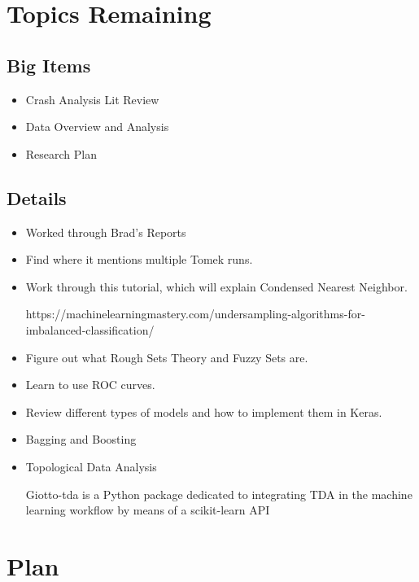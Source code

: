 
\section{Topics Remaining}

\subsection{Big Items}

\begin{itemize}
	\item Crash Analysis Lit Review
	\item Data Overview and Analysis
	\item Research Plan
\end{itemize}

\subsection{Details}
\begin{itemize}
	\item Worked through Brad's Reports
	\item Find where it mentions multiple Tomek runs.  
	\item Work through this tutorial, which will explain Condensed Nearest Neighbor.
	
	https://machinelearningmastery.com/undersampling-algorithms-for-imbalanced-classification/
	
	\item Figure out what Rough Sets Theory and Fuzzy Sets are.  
	\item Learn to use ROC curves.
	\item Review different types of models and how to implement them in Keras.
	\item Bagging and Boosting
	\item Topological Data Analysis
	
	Giotto-tda is a Python package dedicated to integrating TDA in the machine learning workflow by means of a scikit-learn API

\end{itemize}

\section{Plan}

